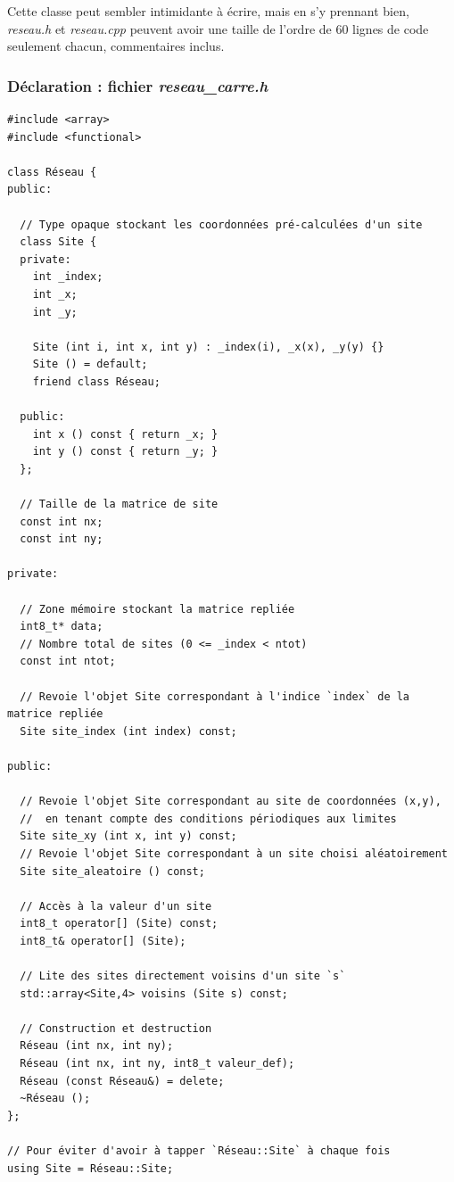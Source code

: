 \documentclass{book}
\def\filename{\emph}
\begin{document}
Cette classe peut sembler intimidante à écrire, mais en s'y prennant bien, \filename{reseau.h} et \filename{reseau.cpp} peuvent avoir une taille de l'ordre de 60 lignes de code seulement chacun, commentaires inclus.
\begin{correction}
\subsubsection*{Déclaration : fichier \filename{reseau\_carre.h}}

\begin{verbatim}
#include <array>
#include <functional>

class Réseau {
public:

  // Type opaque stockant les coordonnées pré-calculées d'un site
  class Site {
  private:
    int _index;
    int _x;
    int _y;

    Site (int i, int x, int y) : _index(i), _x(x), _y(y) {}
    Site () = default;
    friend class Réseau;

  public:
    int x () const { return _x; }
    int y () const { return _y; }
  };

  // Taille de la matrice de site
  const int nx;
  const int ny;

private:

  // Zone mémoire stockant la matrice repliée
  int8_t* data;
  // Nombre total de sites (0 <= _index < ntot)
  const int ntot;

  // Revoie l'objet Site correspondant à l'indice `index` de la matrice repliée
  Site site_index (int index) const;

public:

  // Revoie l'objet Site correspondant au site de coordonnées (x,y),
  //  en tenant compte des conditions périodiques aux limites
  Site site_xy (int x, int y) const;
  // Revoie l'objet Site correspondant à un site choisi aléatoirement
  Site site_aleatoire () const;

  // Accès à la valeur d'un site
  int8_t operator[] (Site) const;
  int8_t& operator[] (Site);

  // Lite des sites directement voisins d'un site `s`
  std::array<Site,4> voisins (Site s) const;

  // Construction et destruction
  Réseau (int nx, int ny);
  Réseau (int nx, int ny, int8_t valeur_def);
  Réseau (const Réseau&) = delete;
  ~Réseau ();
};

// Pour éviter d'avoir à tapper `Réseau::Site` à chaque fois
using Site = Réseau::Site;
\end{verbatim}


\end{correction}
\end{document}
